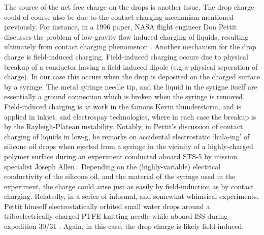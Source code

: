 \documentclass[12pt,a4paper,oneside]{book}
\begin{document}
The source of the net free charge on the drops is another issue. The drop charge could of course also be due to the contact charging mechanism mentioned previously. For instance, in a 1996 paper, NASA flight engineer Don Pettit discusses the problem of low-gravity flow induced charging of liquids, resulting ultimately from contact charging phenomenon \cite{pettit_donald_flow_????}. Another mechanism for the drop charge is field-induced charging. Field-induced charging occurs due to physical breakup of a conductor having a field-induced dipole (e.g a physical seperation of charge). In our case this occurs when the drop is deposited on the charged surface by a syringe. The metal syringe needle tip, and the liquid in the syrigne itself are essentially a ground connection which is broken when the syringe is removed. Field-induced charging is at work in the famous Kevin thunderstorm, and is applied in inkjet, and electrospay technologies, where in each case the breakup is by the Rayleigh-Plateau instability. Notably, in Pettit's discussion of contact charging of liquids in low-g, he remarks on accidental electrostatic `hula-ing' of silicone oil drops when ejected from a syringe in the vicinity of a highly-charged polymer surface during an experiment conducted aboard STS-5 by mission specialist Joseph Allen \cite{pettit_donald_flow_????}. Depending on the (highly-variable) electrical conductivity of the silicone oil, and the material of the syringe used in the experiment, the charge could arise just as easily by field-induction as by contact charging. Relatedly, in a series of informal, and somewhat whimsical experiments, Pettit himself electrostatically orbited small water drops around a triboelectrically charged PTFE knitting needle while aboard ISS during expedition 30/31 \cite{stevenson_electrostatic_2015}. Again, in this case, the drop charge is likely field-induced.  
\end{document}
